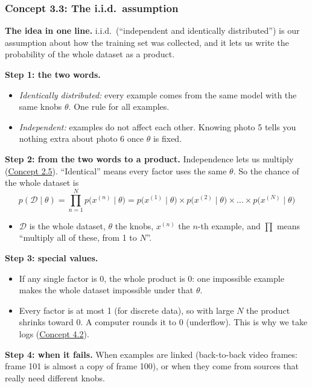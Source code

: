 \documentclass[12pt,a4paper]{article}
\begin{document}
\subsubsection{Concept 3.3: The i.i.d.\ assumption}\label{c3-3}

\textbf{The idea in one line.} i.i.d.\ (``independent and identically distributed'') is our assumption about how the training set was collected, and it lets us write the probability of the whole dataset as a product.

\textbf{Step 1: the two words.}
\begin{itemize}[nosep]
  \item \emph{Identically distributed:} every example comes from the same model with the same knobs $\theta$. One rule for all examples.
  \item \emph{Independent:} examples do not affect each other. Knowing photo 5 tells you nothing extra about photo 6 once $\theta$ is fixed.
\end{itemize}

\textbf{Step 2: from the two words to a product.} Independence lets us multiply (\hyperref[c2-5]{Concept 2.5}). ``Identical'' means every factor uses the same $\theta$. So the chance of the whole dataset is
\[
p(\mathcal{D}\mid\theta)=\prod_{n=1}^{N}p\big(x^{(n)}\mid\theta\big)=p\big(x^{(1)}\mid\theta\big)\times p\big(x^{(2)}\mid\theta\big)\times\dots\times p\big(x^{(N)}\mid\theta\big)
\]
\begin{itemize}[nosep]
  \item $\mathcal{D}$ is the whole dataset, $\theta$ the knobs, $x^{(n)}$ the $n$-th example, and $\prod$ means ``multiply all of these, from 1 to $N$''.
\end{itemize}

\textbf{Step 3: special values.}
\begin{itemize}[nosep]
  \item If any single factor is 0, the whole product is 0: one impossible example makes the whole dataset impossible under that $\theta$.
  \item Every factor is at most 1 (for discrete data), so with large $N$ the product shrinks toward 0. A computer rounds it to 0 (underflow). This is why we take logs (\hyperref[c4-2]{Concept 4.2}).
\end{itemize}

\textbf{Step 4: when it fails.} When examples are linked (back-to-back video frames: frame 101 is almost a copy of frame 100), or when they come from sources that really need different knobs.
\end{document}
